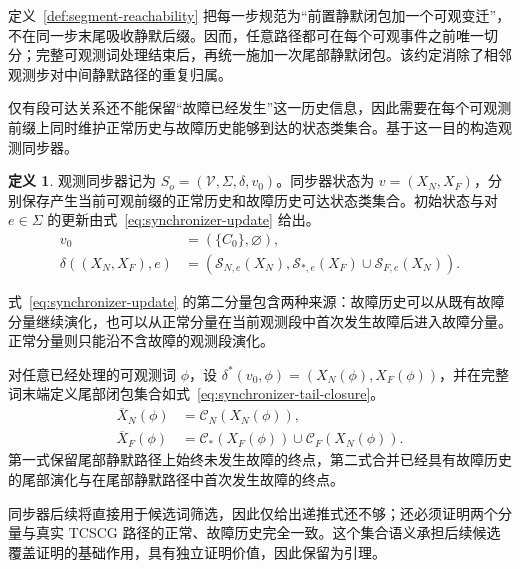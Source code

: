 \documentclass[master,fontset=ubuntu]{shnuthesis}
\theoremstyle{definition}
\newtheorem{thesisdefinition}{定义}
\begin{document}
定义~\ref{def:segment-reachability} 把每一步规范为“前置静默闭包加一个可观变迁”，不在同一步末尾吸收静默后缀。因而，任意路径都可在每个可观事件之前唯一切分；完整可观测词处理结束后，再统一施加一次尾部静默闭包。该约定消除了相邻观测步对中间静默路径的重复归属。

仅有段可达关系还不能保留“故障已经发生”这一历史信息，因此需要在每个可观测前缀上同时维护正常历史与故障历史能够到达的状态类集合。基于这一目的构造观测同步器。

\begin{thesisdefinition}
\label{def:observation-synchronizer}
观测同步器记为 \(S_o=(\mathcal V,\Sigma,\delta,v_0)\)。同步器状态为 \(v=(X_N,X_F)\)，分别保存产生当前可观前缀的正常历史和故障历史可达状态类集合。初始状态与对 \(e\in\Sigma\) 的更新由式~\eqref{eq:synchronizer-update} 给出。
\begin{equation}
\begin{aligned}
v_0
&=\left(\{C_0\},\varnothing\right),\\
\delta((X_N,X_F),e)
&=
\left(
\mathscr S_{N,e}(X_N),
\mathscr S_{\ast,e}(X_F)\cup\mathscr S_{F,e}(X_N)
\right).
\end{aligned}
\label{eq:synchronizer-update}
\end{equation}
\end{thesisdefinition}

式~\eqref{eq:synchronizer-update} 的第二分量包含两种来源：故障历史可以从既有故障分量继续演化，也可以从正常分量在当前观测段中首次发生故障后进入故障分量。正常分量则只能沿不含故障的观测段演化。

对任意已经处理的可观测词 \(\phi\)，设 \(\delta^\ast(v_0,\phi)=(X_N(\phi),X_F(\phi))\)，并在完整词末端定义尾部闭包集合如式~\eqref{eq:synchronizer-tail-closure}。
\begin{equation}
\begin{aligned}
\overline X_N(\phi)
&=\mathscr C_N\!\left(X_N(\phi)\right),\\
\overline X_F(\phi)
&=\mathscr C_\ast\!\left(X_F(\phi)\right)
\cup
\mathscr C_F\!\left(X_N(\phi)\right).
\end{aligned}
\label{eq:synchronizer-tail-closure}
\end{equation}
第一式保留尾部静默路径上始终未发生故障的终点，第二式合并已经具有故障历史的尾部演化与在尾部静默路径中首次发生故障的终点。

同步器后续将直接用于候选词筛选，因此仅给出递推式还不够；还必须证明两个分量与真实 TCSCG 路径的正常、故障历史完全一致。这个集合语义承担后续候选覆盖证明的基础作用，具有独立证明价值，因此保留为引理。
\end{document}
